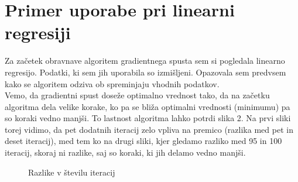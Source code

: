 \documentclass{article}
\begin{document}
\newpage
\section{Primer uporabe pri linearni regresiji}
Za začetek obravnave algoritem gradientnega spusta sem si pogledala linearno regresijo. Podatki, ki sem jih uporabila so izmišljeni. Opazovala sem predvsem kako se algoritem odziva ob spreminjaju vhodnih podatkov.\\

\noindent Vemo, da gradientni spust doseže optimalno vrednost tako, da na začetku algoritma dela velike korake, ko pa se bliža optimalni vrednosti (minimumu) pa so koraki vedno manjši. To lastnost algoritma lahko potrdi slika 2. Na prvi sliki torej vidimo, da pet dodatnih iteracij zelo vpliva na premico (razlika med pet in deset iteracij), med tem ko na drugi sliki, kjer gledamo razliko med 95 in 100 iteracij, skoraj ni razlike, saj so koraki, ki jih delamo vedno manjši. \\

\begin{figure}[h]
    \centering
    \caption{Razlike v številu iteracij}
    \label{fig:foobar}
\end{figure}
\end{document}
